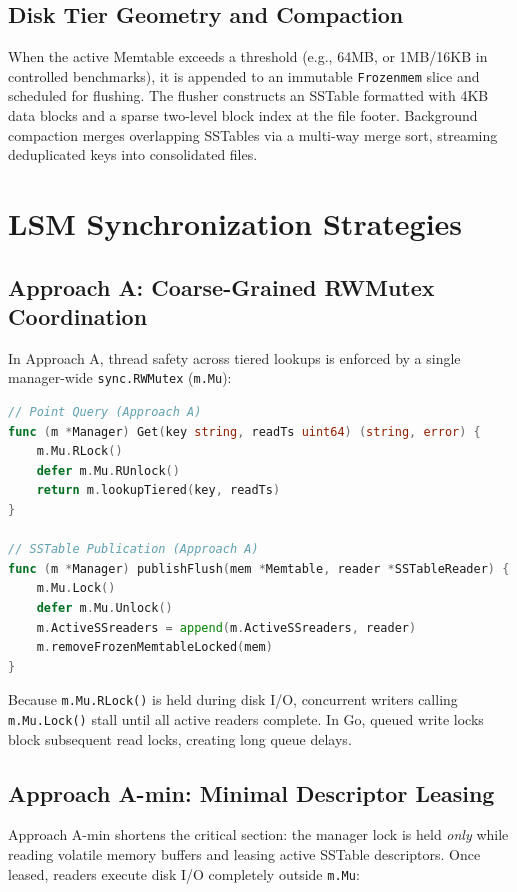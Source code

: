 \documentclass[conference]{IEEEtran}
\begin{document}
\subsection{Disk Tier Geometry and Compaction}
When the active Memtable exceeds a threshold (e.g., 64MB, or 1MB/16KB in controlled benchmarks), it is appended to an immutable \texttt{Frozenmem} slice and scheduled for flushing. The flusher constructs an SSTable formatted with 4KB data blocks and a sparse two-level block index at the file footer. Background compaction merges overlapping SSTables via a multi-way merge sort, streaming deduplicated keys into consolidated files.

\section{LSM Synchronization Strategies}

\subsection{Approach A: Coarse-Grained RWMutex Coordination}
In Approach A, thread safety across tiered lookups is enforced by a single manager-wide \texttt{sync.RWMutex} (\texttt{m.Mu}):

\begin{lstlisting}[language=Go, caption={Approach A point lookup and flush publication}]
// Point Query (Approach A)
func (m *Manager) Get(key string, readTs uint64) (string, error) {
    m.Mu.RLock()
    defer m.Mu.RUnlock()
    return m.lookupTiered(key, readTs)
}

// SSTable Publication (Approach A)
func (m *Manager) publishFlush(mem *Memtable, reader *SSTableReader) {
    m.Mu.Lock()
    defer m.Mu.Unlock()
    m.ActiveSSreaders = append(m.ActiveSSreaders, reader)
    m.removeFrozenMemtableLocked(mem)
}
\end{lstlisting}

Because \texttt{m.Mu.RLock()} is held during disk I/O, concurrent writers calling \texttt{m.Mu.Lock()} stall until all active readers complete. In Go, queued write locks block subsequent read locks, creating long queue delays.

\subsection{Approach A-min: Minimal Descriptor Leasing}
Approach A-min shortens the critical section: the manager lock is held \emph{only} while reading volatile memory buffers and leasing active SSTable descriptors. Once leased, readers execute disk I/O completely outside \texttt{m.Mu}:
\end{document}
